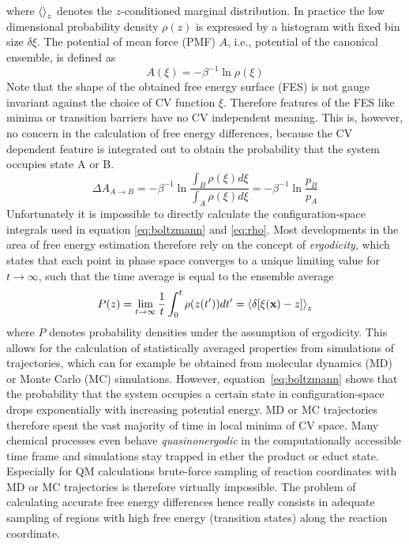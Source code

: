 where $\braket{}_z$ denotes the $z$-conditioned marginal distribution.
In practice the low dimensional probability density $\rho(z)$ is expressed by a histogram with fixed bin size $\delta\xi$.
The potential of mean force (PMF) $A$, i.e., potential of the canonical ensemble, is defined as
\begin{equation}
  A(\xi) = -\beta^{-1}\ln \rho(\xi)
  \label{eq:free energy}
\end{equation}
Note that the shape of the obtained free energy surface (FES) is not gauge invariant against the choice of CV function $\xi$. Therefore features of the FES like minima or transition barriers have no CV independent meaning. This is, however, no concern in the calculation of free energy differences, because the CV dependent feature is integrated out to obtain the probability that the system occupies state A or B.\autocite{bal2020free}
\begin{equation}
  \Delta A_{A\rightarrow B} = -\beta^{-1}\ln \frac{\int_B \rho(\xi)d\xi}{\int_A \rho(\xi)d\xi}=-\beta^{-1}\ln \frac{p_B}{p_A}
  \label{eq:free energy diff}
\end{equation}
Unfortunately it is impossible to directly calculate the configuration-space integrals used in equation \ref{eq:boltzmann} and \ref{eq:rho}.\autocite{chipot2007free}
Most developments in the area of free energy estimation therefore rely on the concept of \textit{ergodicity}, which states that each point in phase space converges to a unique limiting value for $t\rightarrow\infty$, such that the time average is equal to the ensemble average
\begin{equation}
  P(z) = \lim_{t\to\infty}\frac{1}{t} \int_0^t \rho(z(t')) dt' = \braket{\delta [\xi(\textbf{x})-z]}_z
  \label{eq:ergodic}
\end{equation}
where $P$ denotes probability densities under the assumption of ergodicity.
This allows for the calculation of statistically averaged properties from simulations of trajectories, which can for example be obtained from molecular dynamics (MD)\autocite{} or Monte Carlo (MC)\autocite{} simulations.
However, equation~\ref{eq:boltzmann} shows that the probability that the system occupies a certain state in configuration-space drops exponentially with increasing potential energy.
MD or MC trajectories therefore spent the vast majority of time in local minima of CV space.
Many chemical processes even behave \textit{quasinonergodic} in the computationally accessible time frame and simulations stay trapped in ether the product or educt state.
Especially for QM calculations brute-force sampling of reaction coordinates with MD or MC trajectories is therefore virtually impossible.
The problem of calculating accurate free energy differences hence really consists in adequate sampling of regions with high free energy (transition states) along the reaction coordinate.


